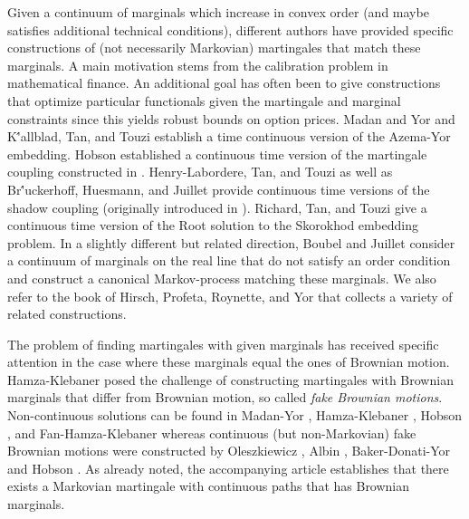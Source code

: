 \documentclass[11pt,a4paper]{article}%
\numberwithin{equation}{section}
\begin{document}

\medskip


Given a continuum of marginals which increase in convex order (and maybe satisfies additional technical conditions), different authors have provided specific constructions of (not necessarily Markovian) martingales that match these marginals. A main motivation stems from the calibration problem in mathematical finance. An additional goal has often been to give constructions that optimize particular functionals given the martingale and marginal  constraints since this yields robust bounds on option prices. Madan and Yor \cite{MaYo02} and 
K\''allblad, Tan, and Touzi \cite{KaTaTo15} establish a time continuous version of the Azema-Yor embedding. 
Hobson \cite{Ho16} established a continuous time version of the martingale  coupling constructed in \cite{HoKl13}.
Henry-Labordere, Tan, and Touzi \cite{HeTaTo16} as well as
Br\''uckerhoff, Huesmann, and Juillet \cite{BrHuJu20} provide continuous time versions of the shadow coupling (originally introduced in \cite{BeJu16}). Richard, Tan, and Touzi \cite{RiTaTo20} give a continuous time version of the Root solution to the Skorokhod embedding problem.
In a slightly different but related direction, Boubel and Juillet  \cite{BoJu18} consider a continuum  of marginals on the real line that do not satisfy an order condition and construct a canonical Markov-process matching these marginals.  We also refer to the book \cite{HiPrRoYo11} of Hirsch, Profeta, Roynette, and Yor that collects a variety of related constructions.  



The problem of finding martingales with given marginals has received specific attention in the case where these marginals equal the ones of Brownian motion. Hamza-Klebaner \cite{HaKl07}  posed the challenge of constructing martingales with Brownian marginals that differ from Brownian motion, so called \emph{fake Brownian motions}. 
 Non-continuous solutions can be found in  Madan-Yor \cite{MaYo02}, Hamza-Klebaner \cite{HaKl07}, Hobson \cite{Ho13}, and Fan-Hamza-Klebaner \cite{FaHaKl15} whereas continuous (but non-Markovian) fake Brownian motions were constructed by Oleszkiewicz \cite{Ol08}, Albin \cite{Al08}, Baker-Donati-Yor \cite{BaDoYo11} and Hobson \cite{Ho16}.
As already noted,  the accompanying article \cite{BePaSc21b} establishes that there exists  a Markovian martingale with continuous paths that  has Brownian marginals. 
\end{document}
